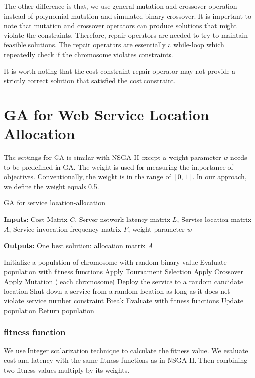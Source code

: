 \documentclass{llncs}
\begin{document}
The other difference is that, we use general mutation and crossover operation instead of polynomial mutation and simulated binary crossover.
It is important to note that mutation and crossover operators can produce solutions that might violate the constraints. 
Therefore, repair operators are needed to try to maintain feasible solutions. The repair operators are essentially a while-loop 
which repeatedly check if the chromosome violates constraints.

It is worth noting that the cost constraint repair operator may not provide a strictly correct solution that satisfied the cost constraint.
\section{GA for Web Service Location Allocation}
The settings for GA is similar with NSGA-II except a weight parameter $w$ needs to be predefined in GA. The weight is used for 
measuring the importance of objectives. Conventionally, the weight is in the range of $[0, 1]$. In our approach, we define the weight equals 0.5.
\begin{algorithm}[htb]
	\caption{GA for service location-allocation}
	\textbf{Inputs:}
		Cost Matrix $C$,
		Server network latency matrix $L$, 
		Service location matrix $A$, 
		Service invocation frequency matrix $F$, 
		weight parameter $w$

	\textbf{Outputs:}
		One best solution: allocation matrix $A$


	\begin{algorithmic}[1]
		\State Initialize a population of chromosome with random binary value
		\State Evaluate population with fitness functions
			\State Apply Tournament Selection
			\State Apply Crossover 
			\State Apply Mutation
			\For( each chromosome)
					\State Deploy the service to a random candidate location
				\EndWhile
					\State Shut down a service from a random location as long as it does not violate service number constraint
					\State Break
					\EndIf
				\EndWhile
			\State Evaluate with fitness functions
			\EndFor
			\State Update population
			\EndWhile
		\State Return population
	\end{algorithmic}
\end{algorithm}

\subsubsection{fitness function}
We use Integer scalarization technique to calculate the fitness value. We evaluate cost and latency with the same fitness functions as in NSGA-II.
Then combining two fitness values multiply by its weights.
\end{document}
